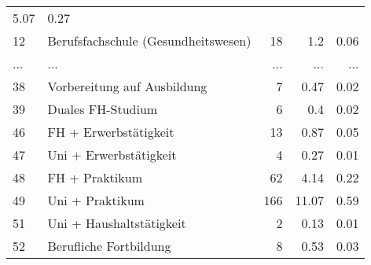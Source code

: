 \begin{longtable}{lXrrr}
          \num[round-mode=places,round-precision=2]{5.07} &
          \num[round-mode=places,round-precision=2]{0.27} \\
        12 & \multicolumn{1}{X}{Berufsfachschule (Gesundheitswesen)} & %
          \num{18} &
          \num[round-mode=places,round-precision=2]{1.2} &
          \num[round-mode=places,round-precision=2]{0.06} \\
       ... & ... & ... & ... & ... \\
        38 & \multicolumn{1}{X}{Vorbereitung auf Ausbildung} & %
          \num{7} &
          \num[round-mode=places,round-precision=2]{0.47} &
          \num[round-mode=places,round-precision=2]{0.02} \\

        39 & \multicolumn{1}{X}{Duales FH-Studium} & %
          \num{6} &
          \num[round-mode=places,round-precision=2]{0.4} &
          \num[round-mode=places,round-precision=2]{0.02} \\

        46 & \multicolumn{1}{X}{FH + Erwerbstätigkeit} & %
          \num{13} &
          \num[round-mode=places,round-precision=2]{0.87} &
          \num[round-mode=places,round-precision=2]{0.05} \\

        47 & \multicolumn{1}{X}{Uni + Erwerbstätigkeit} & %
          \num{4} &
          \num[round-mode=places,round-precision=2]{0.27} &
          \num[round-mode=places,round-precision=2]{0.01} \\

        48 & \multicolumn{1}{X}{FH + Praktikum} & %
          \num{62} &
          \num[round-mode=places,round-precision=2]{4.14} &
          \num[round-mode=places,round-precision=2]{0.22} \\

        49 & \multicolumn{1}{X}{Uni + Praktikum} & %
          \num{166} &
          \num[round-mode=places,round-precision=2]{11.07} &
          \num[round-mode=places,round-precision=2]{0.59} \\

        51 & \multicolumn{1}{X}{Uni + Haushaltstätigkeit} & %
          \num{2} &
          \num[round-mode=places,round-precision=2]{0.13} &
          \num[round-mode=places,round-precision=2]{0.01} \\

        52 & \multicolumn{1}{X}{Berufliche Fortbildung} & %
          \num{8} &
          \num[round-mode=places,round-precision=2]{0.53} &
          \num[round-mode=places,round-precision=2]{0.03} \\


\end{longtable}

